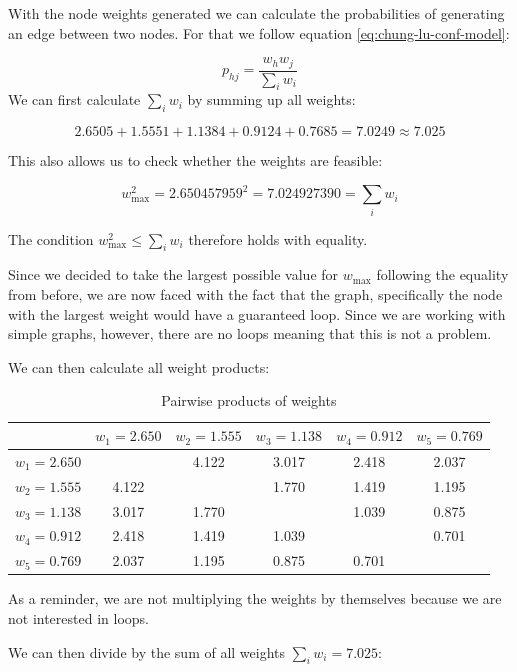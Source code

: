 \documentclass[12pt, a4paper]{article}   %
\begin{document}
With the node weights generated we can calculate the probabilities of generating an edge between two nodes. For that we follow equation \ref{eq:chung-lu-conf-model}:

\[
    p_{hj} = \frac{w_h w_j}{\sum_{i}{w_i}}
\]
We can first calculate \( \sum_{i}{w_i} \) by summing up all weights:

\[
2.6505+1.5551+1.1384+0.9124+0.7685 = 7.0249 \approx 7.025
\]

This also allows us to check whether the weights are feasible:

\[
w_{\text{max}}^2 = 2.650457959^2 = 7.024927390 = \sum_{i}{w_i}
\]

The condition \( w_{\text{max}}^2 \leq \sum_{i}{w_i} \) therefore holds with equality.

Since we decided to take the largest possible value for \( w_{\text{max}} \) following the equality from before, we are now faced with the fact that the graph, specifically the node with the largest weight would have a guaranteed loop. Since we are working with simple graphs, however, there are no loops meaning that this is not a problem.

We can then calculate all weight products:

\begin{table}[H]
  \centering
  \label{tab:calculated-probabilities-step-1}
  \begin{tabular}{c S[table-format=2.3] S[table-format=2.3] S[table-format=2.3] S[table-format=2.3] S[table-format=2.3]}
    \toprule
    {} & {\(w_1 = 2.650\)} & {\(w_2 = 1.555\)} & {\(w_3 = 1.138\)} & {\(w_4 = 0.912\)} & {\(w_5 = 0.769\)} \\
    \midrule
    \(w_1 = 2.650\) & {} & 4.122 & 3.017 & 2.418 & 2.037 \\
    \(w_2 = 1.555\) & 4.122 & {} & 1.770 & 1.419 & 1.195 \\
    \(w_3 = 1.138\) & 3.017 & 1.770 & {} & 1.039 & 0.875 \\
    \(w_4 = 0.912\) & 2.418 & 1.419 & 1.039 & {} & 0.701 \\
    \(w_5 = 0.769\) & 2.037 & 1.195 & 0.875 & 0.701 & {} \\
    \bottomrule
  \end{tabular}
  \caption{Pairwise products of weights}
\end{table}

As a reminder, we are not multiplying the weights by themselves because we are not interested in loops.

We can then divide by the sum of all weights \( \sum_{i}{w_i}=7.025 \):
\end{document}
